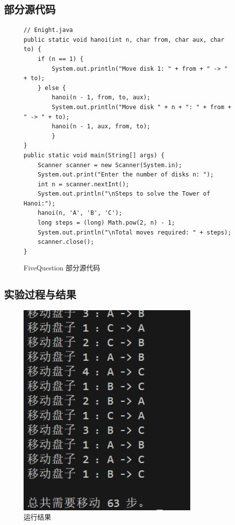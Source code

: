 \documentclass[12pt,a4paper]{article}
\begin{document}
\subsection*{部分源代码}
\begin{figure}[H]
\centering
\begin{lstlisting}
// Enight.java
public static void hanoi(int n, char from, char aux, char to) {
    if (n == 1) {
        System.out.println("Move disk 1: " + from + " -> " + to);
    } else {
        hanoi(n - 1, from, to, aux);
        System.out.println("Move disk " + n + ": " + from + " -> " + to);
        hanoi(n - 1, aux, from, to);
        }
}
public static void main(String[] args) {
    Scanner scanner = new Scanner(System.in);
    System.out.print("Enter the number of disks n: ");
    int n = scanner.nextInt();
    System.out.println("\nSteps to solve the Tower of Hanoi:");
    hanoi(n, 'A', 'B', 'C');
    long steps = (long) Math.pow(2, n) - 1;
    System.out.println("\nTotal moves required: " + steps);
    scanner.close();
}

\end{lstlisting}

\caption{FiveQuestion 部分源代码}
\end{figure}

\subsection*{实验过程与结果}

\begin{figure}[H]
\centering
\includegraphics[width=0.8\textwidth]{eight.png}
\caption{运行结果}
\end{figure}
\end{document}
